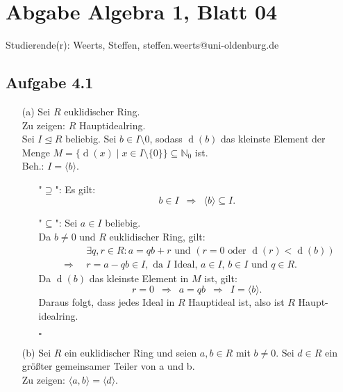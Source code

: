 \documentclass[12pt]{article}
\newcommand{\QED}{\begin{flushright} $\square$ \end{flushright}}
\newcommand{\df}{\enspace\Longrightarrow\enspace}
\newcommand{\isIdeal}{\trianglelefteq}
\newcommand{\ideal}[1]{\langle#1\rangle}
\newcommand{\enorm}{\operatorname{d}}
\begin{document}
\section*{Abgabe Algebra 1, Blatt 04}

Studierende(r): Weerts, Steffen, steffen.weerts@uni-oldenburg.de

\subsection*{Aufgabe 4.1}
\begin{enumerate}
	\item[(a)] Sei $R$ euklidischer Ring. \\
	Zu zeigen: $R$ Hauptidealring. \\
	Sei $I\isIdeal R$ beliebig. Sei $b\in I\setminus{0}$, sodass $\enorm(b)$ das kleinste Element der Menge $M=\{\enorm(x)\mid x\in I\setminus\{0\}\}\subseteq\mathbb{N}_0$ ist. \\
	Beh.: $I=\ideal{b}$.
	\begin{enumerate}
		\item["$\supseteq$":] Es gilt: $$b\in I\df\ideal{b}\subseteq I.$$
		
		\item["$\subseteq$":] Sei $a\in I$ beliebig. \\
		Da $b\neq 0$ und $R$ euklidischer Ring, gilt:
		\begin{align*}
			&\exists q,r\in R: a=qb+r\text{ und }\left(r=0\text{ oder }\enorm(r)<\enorm(b)\right) \\
			\df &r=a-qb\in I,\text{ da $I$ Ideal, $a\in I$, $b\in I$ und $q\in R$}.
		\end{align*}
		Da $\enorm(b)$ das kleinste Element in $M$ ist, gilt: $$r=0\df a=qb\df I=\ideal{b}.$$
		Daraus folgt, dass jedes Ideal in $R$ Hauptideal ist, also ist $R$ Haupt- idealring.
		\QED
	\end{enumerate}
	
	\item[(b)] Sei $R$ ein euklidischer Ring und seien $a,b\in R$ mit $b\neq 0$. Sei $d\in R$ ein größter gemeinsamer Teiler von a und b. \\
	Zu zeigen: $\ideal{a,b}=\ideal{d}$.\\
	

\end{enumerate}
\end{document}
